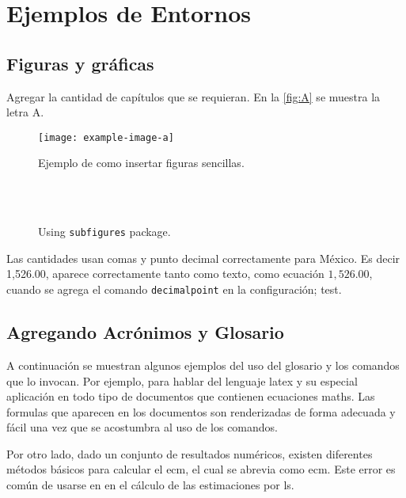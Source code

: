 \chapter{Ejemplos de Entornos} %
\label{ch:MarcoTeorico} 

\section{Figuras y gráficas}
Agregar la cantidad de capítulos que se requieran. En la \autoref{fig:A} se muestra la letra A.


\blindtext[1] %


\begin{figure}[!h]
	\centering
	\texttt{[image: example-image-a]}
	\caption{Ejemplo de como insertar figuras sencillas.}
	\label{fig:A}
\end{figure}

\blindtext[1] %




\begin{figure}[!h]%
\centering
{}%
\\%
%
~ %
%
\caption{Using \texttt{subfigures} package.}
\label{fig:subFigures}
\end{figure}


Las cantidades usan comas y punto decimal correctamente para México. Es decir 1,526.00, aparece correctamente tanto como texto, como ecuación $1,526.00$, cuando se agrega el comando \texttt{decimalpoint} en la configuración; test.

\section{Agregando Acrónimos y Glosario}
A continuación se muestran algunos ejemplos del uso del glosario y los comandos que lo invocan. Por ejemplo, para hablar del lenguaje \Gls{latex} y su especial aplicación en todo tipo de documentos que contienen ecuaciones \gls{maths}. Las \Glspl{formula} que aparecen en los documentos son renderizadas de forma adecuada y fácil una vez que se acostumbra al uso de los comandos.

	Por otro lado, dado un conjunto de resultados numéricos, existen diferentes métodos básicos para calcular el \acrlong{ecm}, el cual se abrevia como \acrshort{ecm}. Este error es común de usarse en en el cálculo de las estimaciones por \acrfull{ls}.